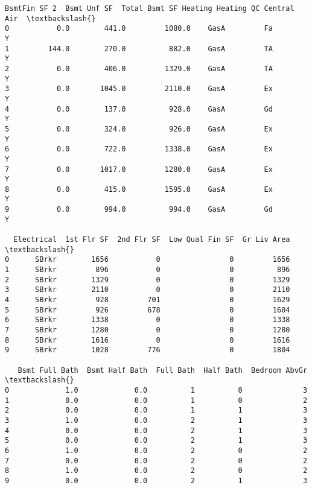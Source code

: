 \documentclass[11pt]{article}
\begin{document}
\begin{tcolorbox}[breakable, size=fbox, boxrule=.5pt, pad at break*=1mm, opacityfill=0]
\begin{Verbatim}[commandchars=\\\{\}]
   BsmtFin SF 2  Bsmt Unf SF  Total Bsmt SF Heating Heating QC Central Air  \textbackslash{}
0           0.0        441.0         1080.0    GasA         Fa           Y
1         144.0        270.0          882.0    GasA         TA           Y
2           0.0        406.0         1329.0    GasA         TA           Y
3           0.0       1045.0         2110.0    GasA         Ex           Y
4           0.0        137.0          928.0    GasA         Gd           Y
5           0.0        324.0          926.0    GasA         Ex           Y
6           0.0        722.0         1338.0    GasA         Ex           Y
7           0.0       1017.0         1280.0    GasA         Ex           Y
8           0.0        415.0         1595.0    GasA         Ex           Y
9           0.0        994.0          994.0    GasA         Gd           Y

  Electrical  1st Flr SF  2nd Flr SF  Low Qual Fin SF  Gr Liv Area  \textbackslash{}
0      SBrkr        1656           0                0         1656
1      SBrkr         896           0                0          896
2      SBrkr        1329           0                0         1329
3      SBrkr        2110           0                0         2110
4      SBrkr         928         701                0         1629
5      SBrkr         926         678                0         1604
6      SBrkr        1338           0                0         1338
7      SBrkr        1280           0                0         1280
8      SBrkr        1616           0                0         1616
9      SBrkr        1028         776                0         1804

   Bsmt Full Bath  Bsmt Half Bath  Full Bath  Half Bath  Bedroom AbvGr  \textbackslash{}
0             1.0             0.0          1          0              3
1             0.0             0.0          1          0              2
2             0.0             0.0          1          1              3
3             1.0             0.0          2          1              3
4             0.0             0.0          2          1              3
5             0.0             0.0          2          1              3
6             1.0             0.0          2          0              2
7             0.0             0.0          2          0              2
8             1.0             0.0          2          0              2
9             0.0             0.0          2          1              3


\end{Verbatim}
\end{tcolorbox}
\end{document}
